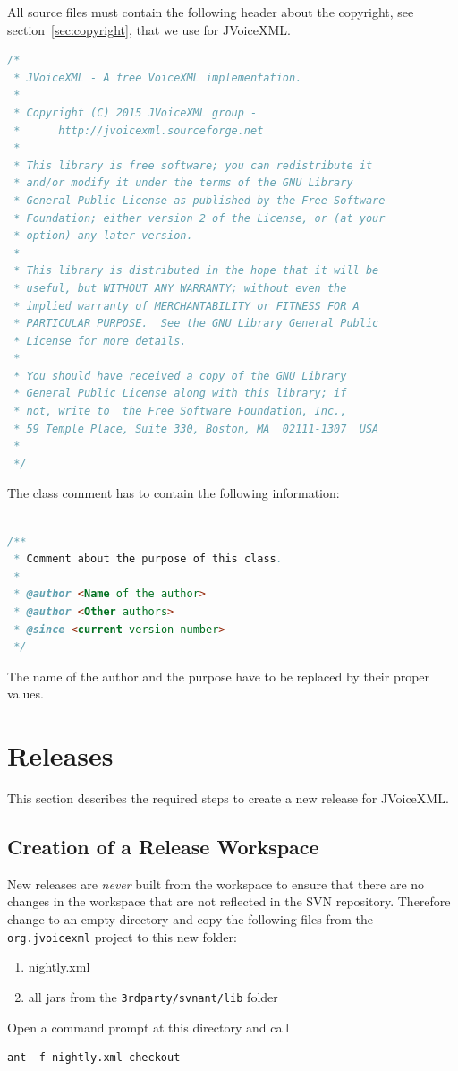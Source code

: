 \documentclass[11pt,a4paper]{article}
\begin{document}
All source files must contain the following header about the 
copyright, see section~\ref{sec:copyright}, that we use for JVoiceXML.

\begin{lstlisting}[language=Java]
/*
 * JVoiceXML - A free VoiceXML implementation.
 *
 * Copyright (C) 2015 JVoiceXML group - 
 *      http://jvoicexml.sourceforge.net
 *
 * This library is free software; you can redistribute it 
 * and/or modify it under the terms of the GNU Library 
 * General Public License as published by the Free Software 
 * Foundation; either version 2 of the License, or (at your 
 * option) any later version.
 *
 * This library is distributed in the hope that it will be 
 * useful, but WITHOUT ANY WARRANTY; without even the 
 * implied warranty of MERCHANTABILITY or FITNESS FOR A 
 * PARTICULAR PURPOSE.  See the GNU Library General Public 
 * License for more details.
 *
 * You should have received a copy of the GNU Library 
 * General Public License along with this library; if 
 * not, write to  the Free Software Foundation, Inc., 
 * 59 Temple Place, Suite 330, Boston, MA  02111-1307  USA
 *
 */
\end{lstlisting}

The class comment has to contain the following information:

\begin{lstlisting}[language=Java]

/**
 * Comment about the purpose of this class.
 *
 * @author <Name of the author>
 * @author <Other authors>
 * @since <current version number>
 */
\end{lstlisting}

The name of the author and the purpose have to be replaced by their proper
values.

\section{Releases}

This section describes the required steps to create a new release for
JVoice\-XML.

\subsection{Creation of a Release Workspace}

New releases are \emph{never} built from the workspace to ensure that there are
no changes in the workspace that are not reflected in the SVN repository.
Therefore change to an empty directory and copy the following files from the
\texttt{org.jvoicexml} project to this new folder:
\begin{enumerate}
  \item nightly.xml
  \item all jars from the \texttt{3rdparty/svnant/lib} folder
\end{enumerate}
Open a command prompt at this directory and call
\begin{lstlisting}
ant -f nightly.xml checkout
\end{lstlisting}
\end{document}
